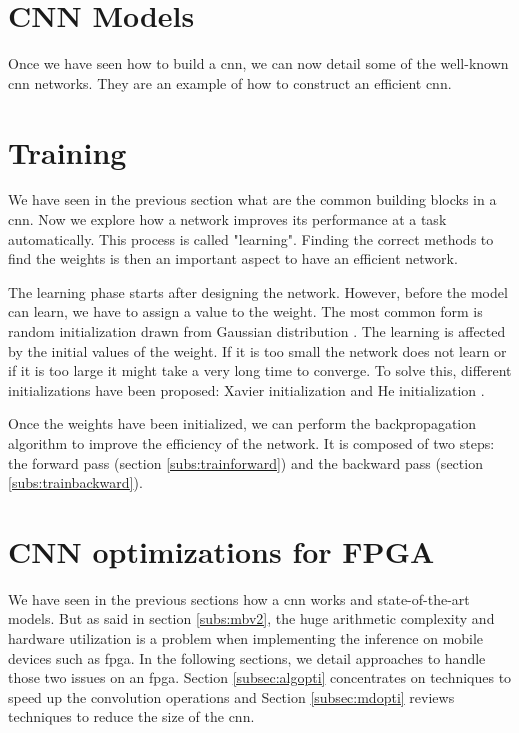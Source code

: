 \section{CNN Models} \label{sec:models}
Once we have seen how to build a \acrshort{cnn}, we can now detail some of the well-known \acrshort{cnn} networks. They are an example of how to construct an efficient \acrshort{cnn}.

%

%
%
\section{Training} \label{sec:train}
We have seen in the previous section what are the common building blocks in a \acrshort{cnn}. Now we explore how a network improves its performance at a task automatically. This process is called "learning". Finding the correct methods to find the weights is then an important aspect to have an efficient network.

The learning phase starts after designing the network. However, before the model can learn, we have to assign a value to the weight. The most common form is random initialization drawn from Gaussian distribution \cite{he_delving_2015}. The learning is affected by the initial values of the weight. If it is too small the network does not learn or if it is too large it might take a very long time to converge. To solve this, different initializations have been proposed: Xavier initialization \cite{glorot_understanding_2010} and He initialization \cite{he_delving_2015}.

Once the weights have been initialized, we can perform the backpropagation algorithm to improve the efficiency of the network. It is composed of two steps: the forward pass (section \ref{subs:trainforward}) and the backward pass (section \ref{subs:trainbackward}).
%

%

%
%
\section{CNN optimizations for FPGA}
%
%
We have seen in the previous sections how a \acrshort{cnn} works and state-of-the-art models. But as said in section \ref{subs:mbv2}, the huge arithmetic complexity and hardware utilization is a problem when implementing the inference on mobile devices such as \acrshort{fpga}. In the following sections, we detail approaches to handle those two issues on an \acrshort{fpga}. Section \ref{subsec:algopti} concentrates on techniques to speed up the convolution operations and Section \ref{subsec:mdopti} reviews techniques to reduce the size of the \acrshort{cnn}.
%

%

